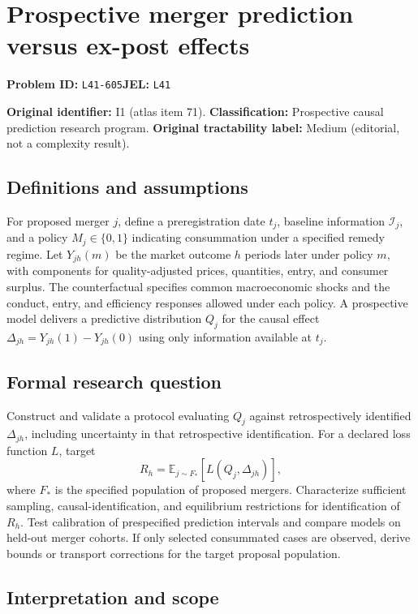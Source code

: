 \documentclass[11pt,a4paper]{article}
\begin{document}
\section*{Prospective merger prediction versus ex-post effects}
\textbf{Problem ID:} \texttt{L41-605}\quad \textbf{JEL:} \texttt{L41}\par
\label{problem:OP-0071}
\label{atlas:prob:I1}

\noindent\textbf{Original identifier:} I1 (atlas item 71). \textbf{Classification:} Prospective causal prediction research program. \textbf{Original tractability label:} Medium (editorial, not a complexity result).

\subsection*{Definitions and assumptions}

For proposed merger $j$, define a preregistration date $t_j$, baseline information $\mathcal I_j$, and a policy $M_j\in\{0,1\}$ indicating consummation under a specified remedy regime. Let $Y_{jh}(m)$ be the market outcome $h$ periods later under policy $m$, with components for quality-adjusted prices, quantities, entry, and consumer surplus. The counterfactual specifies common macroeconomic shocks and the conduct, entry, and efficiency responses allowed under each policy. A prospective model delivers a predictive distribution $Q_j$ for the causal effect $\Delta_{jh}=Y_{jh}(1)-Y_{jh}(0)$ using only information available at $t_j$.

\subsection*{Formal research question}

Construct and validate a protocol evaluating $Q_j$ against retrospectively identified $\Delta_{jh}$, including uncertainty in that retrospective identification. For a declared loss function $L$, target
\[
R_h=\mathbb E_{j\sim F_*}[L(Q_j,\Delta_{jh})],
\]
where $F_*$ is the specified population of proposed mergers. Characterize sufficient sampling, causal-identification, and equilibrium restrictions for identification of $R_h$. Test calibration of prespecified prediction intervals and compare models on held-out merger cohorts. If only selected consummated cases are observed, derive bounds or transport corrections for the target proposal population.

\subsection*{Interpretation and scope}
\end{document}
